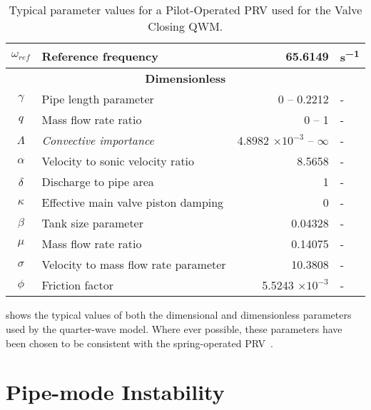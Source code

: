 \begin{table}[ht]
\begin{tabular}{c|l|r|l}
        $\omega_{ref}$ & Reference frequency & 65.6149 & \si{s^{-1}} \\ \hline \hline
        \multicolumn{4}{c}{\textbf{Dimensionless}} \\ \hline
        $\gamma$ & Pipe length parameter & 0 -- 0.2212 & - \\ \hline
        $q$ & Mass flow rate ratio & 0 -- 1 & - \\ \hline
        $\Lambda$ & \textit{Convective importance} & 4.8982 $\times 10^{-3}$ -- $\infty$ & - \\ \hline
        $\alpha$ & Velocity to sonic velocity ratio & 8.5658 & - \\ \hline
        $\delta$ & Discharge to pipe area & 1 & - \\ \hline
        $\kappa$ & Effective main valve piston damping & 0 & - \\ \hline
        $\beta$ & Tank size parameter & 0.04328 & - \\ \hline
        $\mu$ & Mass flow rate ratio & 0.14075 & - \\ \hline
        $\sigma$ & Velocity to mass flow rate parameter & 10.3808 & - \\ \hline
        $\phi$ & Friction factor & 5.5243 $\times 10^{-3}$ & - \\
    \end{tabular}
    \caption{Typical parameter values for a Pilot-Operated PRV used for the Valve Closing QWM.}
    \label{tab: ValveClosingQWMParameterValues}
\end{table}

 shows the typical values of both the dimensional and dimensionless parameters used by the quarter-wave model. Where ever possible, these parameters have been chosen to be consistent with the spring-operated PRV~\cite{Hos2016DynamicService}.

\section{Pipe-mode Instability} \label{subsec: QWMAnalyticalBound}

